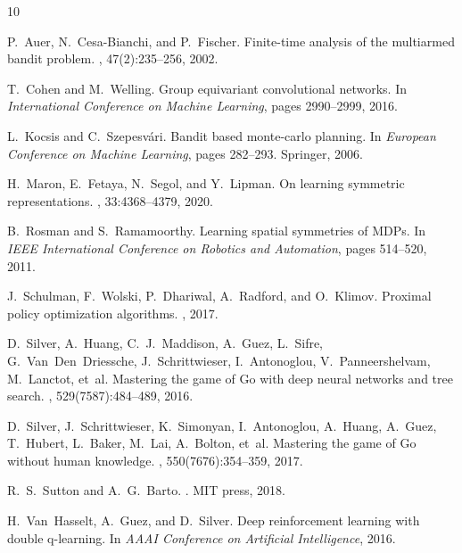 \documentclass{article}
\begin{document}
\begin{thebibliography}{10}

P.~Auer, N.~Cesa-Bianchi, and P.~Fischer.
\newblock Finite-time analysis of the multiarmed bandit problem.
, 47(2):235--256, 2002.

T.~Cohen and M.~Welling.
\newblock Group equivariant convolutional networks.
\newblock In {\em International Conference on Machine Learning}, pages 2990--2999, 2016.

L.~Kocsis and C.~Szepesv{\'a}ri.
\newblock Bandit based monte-carlo planning.
\newblock In {\em European Conference on Machine Learning}, pages 282--293. Springer, 2006.

H.~Maron, E.~Fetaya, N.~Segol, and Y.~Lipman.
\newblock On learning symmetric representations.
, 33:4368--4379, 2020.

B.~Rosman and S.~Ramamoorthy.
\newblock Learning spatial symmetries of {MDP}s.
\newblock In {\em IEEE International Conference on Robotics and Automation}, pages 514--520, 2011.

J.~Schulman, F.~Wolski, P.~Dhariwal, A.~Radford, and O.~Klimov.
\newblock Proximal policy optimization algorithms.
, 2017.

D.~Silver, A.~Huang, C.~J.~Maddison, A.~Guez, L.~Sifre, G.~Van~Den~Driessche, J.~Schrittwieser, I.~Antonoglou, V.~Panneershelvam, M.~Lanctot, et~al.
\newblock Mastering the game of {G}o with deep neural networks and tree search.
, 529(7587):484--489, 2016.

D.~Silver, J.~Schrittwieser, K.~Simonyan, I.~Antonoglou, A.~Huang, A.~Guez, T.~Hubert, L.~Baker, M.~Lai, A.~Bolton, et~al.
\newblock Mastering the game of {G}o without human knowledge.
, 550(7676):354--359, 2017.

R.~S.~Sutton and A.~G.~Barto.
.
\newblock MIT press, 2018.

H.~Van~Hasselt, A.~Guez, and D.~Silver.
\newblock Deep reinforcement learning with double q-learning.
\newblock In {\em AAAI Conference on Artificial Intelligence}, 2016.


\end{thebibliography}
\end{document}
